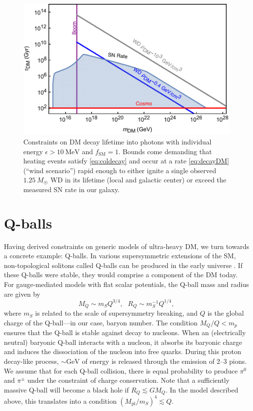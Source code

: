 \documentclass[twocolumn, preprintnumbers,amsmath,amssymb,prd, superscriptaddress]{revtex4}
\begin{document}
\begin{figure}
\includegraphics[scale=.45]{decayobservation.pdf}
\caption{Constraints on DM decay lifetime into photons with individual energy $\epsilon > 10~\text{MeV}$ and $f_\text{SM} = 1$. Bounds come demanding that heating events satisfy \eqref{eq:coldecay} and occur at a rate \eqref{eq:decayDM} (``wind scenario'') rapid enough to either ignite a single observed $1.25~M_{\astrosun}$ WD in its lifetime (local and galactic center) or exceed the measured SN rate in our galaxy.}
\label{fig:decayclasses}
\end{figure}

\section{Q-balls}
\label{sec:QBalls}

Having derived constraints on generic models of ultra-heavy DM, we turn towards a concrete example: Q-balls.
In various supersymmetric extensions of the SM, non-topological solitons called Q-balls can be produced in the early universe \cite{Coleman:1985ki, Kusenko:1997si}.
If these Q-balls were stable, they would comprise a component of the DM today.
For gauge-mediated models with flat scalar potentials, the Q-ball mass and radius are given by
\begin{equation}
\label{eq:Qballprop}
M_Q \sim m_S Q^{3/4}, ~~~ R_Q \sim m_S^{-1} Q^{1/4},
\end{equation}
where $m_S$ is related to the scale of supersymmetry breaking, and $Q$ is the global charge of the Q-ball---in our case, baryon number.
The condition $M_Q/Q < m_p$ ensures that the Q-ball is stable against decay to nucleons.
When an (electrically neutral) baryonic Q-ball interacts with a nucleon, it absorbs its baryonic charge and induces the dissociation of the nucleon into free quarks.
During this proton decay-like process, $\sim \text{GeV}$ of energy is released through the emission of 2--3 pions.
We assume that for each Q-ball collision, there is equal probability to produce $\pi^0$ and $\pi^\pm$ under the constraint of charge conservation.
Note that a sufficiently massive Q-ball will become a black hole if $R_Q \lesssim G M_Q$.
In the model described above, this translates into a condition $(M_\text{pl}/m_S)^4 \lesssim Q$.
\end{document}
